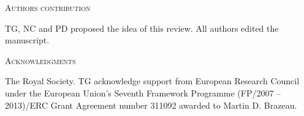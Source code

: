 \documentclass[12pt,letterpaper]{article}
\renewcommand{\section}[1]{%
\bigskip
\begin{center}
\begin{Large}
\normalfont\scshape #1
\medskip
\end{Large}
\end{center}}
\begin{document}












\section{Authors contribution}
TG, NC and PD proposed the idea of this review. All authors edited the manuscript.

\section{Acknowledgments}
The Royal Society.
TG acknowledge support from European Research Council under the European Union's Seventh Framework Programme (FP/2007 – 2013)/ERC Grant Agreement number 311092 awarded to Martin D. Brazeau.




\end{document}
